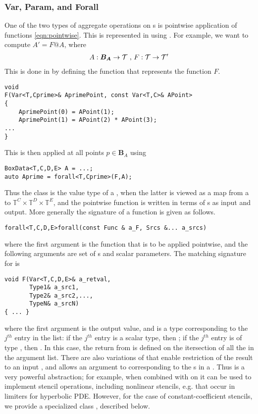 \documentclass[12pt]{article}
\newcommand{\BoxData}{\code{BoxData} }
\begin{document}
\subsubsection*{Var, Param, and Forall}

One of the two types of aggregate operations on s is pointwise application of functions \eqref{eqn:pointwise}. This is represented in \libname using 
. For example, we want to compute $A' = F@A$, where
\begin{gather*}
A:\boldsymbol{B_A} \rightarrow \mathcal{T} \hbox{ , } F:\mathcal{T} \rightarrow \mathcal{T}'
\end{gather*}
This is done in \libname by defining the function  that represents the function $F$.
\begin{verbatim}
void 
F(Var<T,Cprime>& AprimePoint, const Var<T,C>& APoint>
{
	AprimePoint(0) = APoint(1); 
	AprimePoint(1) = APoint(2) * APoint(3);
...
}
\end{verbatim}
This is then applied at all points $p \in \boldsymbol{B}_A$ using 
\begin{verbatim}
BoxData<T,C,D,E> A = ...;
auto Aprime = forall<T,Cprime>(F,A);
\end{verbatim}
Thus the class  is the value type of a \BoxData , when the latter is viewed as a map from a  to $\mathbb{T}^C \times \mathbb{T}^D \times \mathbb{T}^E$, and the pointwise function  is written in terms of s as input and output. More generally the signature of a  function is given as follows.
\begin{verbatim}
forall<T,C,D,E>forall(const Func & a_F, Srcs &... a_srcs) 
\end{verbatim} 
where the first argument is the function  that is to be applied pointwise, and the following arguments are set of s and scalar parameters. The matching signature for  is 
\begin{verbatim}
void F(Var<T,C,D,E>& a_retval,
       Type1& a_src1,
       Type2& a_src2,...,
       TypeN& a_srcN)
{ ... }
\end{verbatim}
where the first argument is the output value, and
 is a type corresponding to the $j^{th}$ entry in the   list: if the $j^{th}$ entry is a scalar type, then ; if the  $j^{th}$ entry is of type , then . In this case, the return  from  is defined on the itersection of all the  in the argument list. There are also variations of  that enable restriction of the result to an input , and allows an argument to  corresponding to the s in a . Thus  is a very powerful abstraction; for example, when combined with  on  it can be used to implement stencil operations, including nonlinear stencils, e.g. that occur in limiters for hyperbolic PDE. However, for the case of constant-coefficient stencils, we provide a specialized class , described below. 
\end{document}
